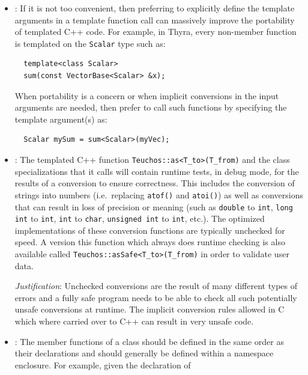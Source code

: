 \begin{itemize}

{}\item\GCGExplicitTemplateArguments: If it is not too convenient,
then preferring to explicitly define the template arguments in a
template function call can massively improve the portability of
templated C++ code.  For example, in Thyra, every non-member function
is templated on the {}\texttt{Scalar} type such as:

{\small\begin{verbatim}
  template<class Scalar>
  sum(const VectorBase<Scalar> &x);
\end{verbatim}}

When portability is a concern or when implicit conversions in the
input arguments are needed, then prefer to call such functions by
specifying the template argument(s) as:

{\small\begin{verbatim}
  Scalar mySum = sum<Scalar>(myVec);
\end{verbatim}}

{}\item\GCGTeuchosAs: The templated C++ function
{}\texttt{Teuchos::as<T\_to>(T\_from)} and the class specializations that it
calls will contain runtime tests, in debug mode, for the results of a
conversion to ensure correctness.  This includes the conversion of strings
into numbers (i.e.\ replacing {}\texttt{atof()} and {}\texttt{atoi()}) as well
as conversions that can result in loss of precision or meaning (such as
{}\texttt{double} to {}\texttt{int}, {}\texttt{long int} to {}\texttt{int},
{}\texttt{int} to {}\texttt{char}, {}\texttt{unsigned int} to {}\texttt{int},
etc.).  The optimized implementations of these conversion functions are
typically unchecked for speed.  A version this function which always does
runtime checking is also available called
{}\texttt{Teuchos\-::asSafe\-<\-T\_to\->\-(\-T\_from\-)} in order to validate
user data.

{}\textit{Justification}: Unchecked conversions are the result of many
different types of errors and a fully safe program needs to be able to check
all such potentially unsafe conversions at runtime.  The implicit conversion
rules allowed in C which where carried over to C++ can result in very unsafe
code.

{}\item\GCGNamespaceClassFuncDefs: The member functions of a class should be
defined in the same order as their declarations and should generally be
defined within a namespace enclosure.  For example, given the declaration of


\end{itemize}
